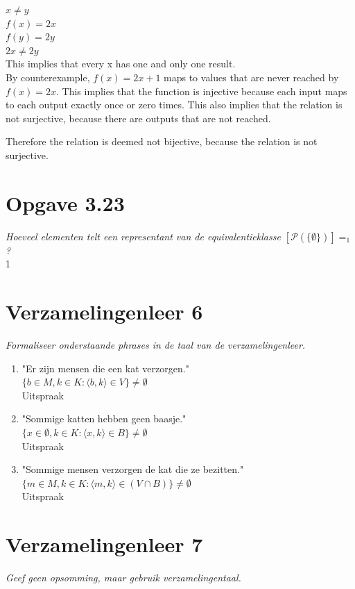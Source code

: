 \documentclass[11pt]{article}
\begin{document}
$ x \neq y $
\\
$ f(x) = 2x $
\\
$ f(y) = 2y $
\\
$ 2x \neq 2y $
\\

This implies that every x has one and only one result.
\\

By counterexample, $ f(x) = 2x + 1$ maps to values that are never reached by $ f(x) = 2x $. This implies that the function is injective because each input maps to each output exactly once or zero times. This also implies that the relation is not surjective, because there are outputs that are not reached.

Therefore the relation is deemed not bijective, because the relation is not surjective.

\section*{Opgave 3.23}
\textit{Hoeveel elementen telt een representant van de equivalentieklasse
$[\mathcal{P}(\{\emptyset\})]=_1  $ ?} \\

1

\section*{Verzamelingenleer 6}
\textit{Formaliseer onderstaande phrases in de taal van de verzamelingenleer.}

\begin{enumerate}
\item "Er zijn mensen die een kat verzorgen."
\\
$ \{b \in M, k \in K : \langle b, k \rangle \in V \} \neq \emptyset $
\\
Uitspraak
\item "Sommige katten hebben geen baasje."
\\
$ \{x \in \emptyset, k \in K : \langle x, k \rangle \in B \} \neq \emptyset $
\\
Uitspraak
\item "Sommige mensen verzorgen de kat die ze bezitten."
\\
$ \{m \in M, k \in K : \langle m, k \rangle \in (V \cap B) \} \neq \emptyset $
\\
Uitspraak
\end{enumerate}

\section*{Verzamelingenleer 7}
\textit{Geef geen opsomming, maar gebruik verzamelingentaal.}
\end{document}
